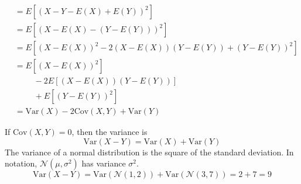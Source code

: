 \documentclass{article}
\begin{document}
\begin{enumerate}[label=\alph*)]
\[\begin{aligned}
                                      & = {E}\left[(X - Y - {E}(X) + {E}(Y))^2\right]                                  \\
                                      & = {E}\left[(X - {E}(X) - (Y - {E}(Y)))^2\right]                                \\
                                      & = {E}\left[(X - {E}(X))^2 - 2(X - {E}(X))(Y - {E}(Y)) + (Y - {E}(Y))^2 \right] \\
                                      & = {E}\left[(X - {E}(X))^2\right]                                               \\
                                      & \phantom{{=E}[} - 2{E}\left[(X - {E}(X))(Y - {E}(Y))\right]                    \\
                                      & \phantom{{=E}[} + {E}\left[(Y - {E}(Y))^2\right]                               \\
                                      & = \mathrm{Var}(X) - 2\mathrm{Cov}(X, Y) + \mathrm{Var}(Y)
              \end{aligned}
          \]

          If $\mathrm{Cov}(X, Y) = 0$, then the variance is \[\mathrm{Var}(X - Y) = \mathrm{Var}(X) + \mathrm{Var}(Y)\]
          The variance of a normal distribution is the square of the standard deviation.
          In notation, $\mathcal{N}(\mu, \sigma^2)$ has variance $\sigma^2$.
          \[\mathrm{Var}(X - Y) = \mathrm{Var}(\mathcal{N}(1,2)) + \mathrm{Var}(\mathcal{N}(3,7)) = 2 + 7 = 9\]
\end{enumerate}
\end{document}
